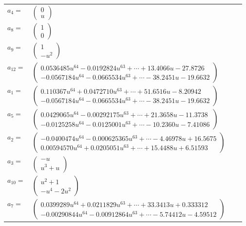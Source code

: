 \documentclass[1p]{elsarticle_modified}
\theoremstyle{definition}
\begin{document}
\begin{tabular}{m{7pt} m{180pt} m{7pt} m{180pt} }
\flushright $a_{4}=$&$\begin{pmatrix}0\\u\end{pmatrix}$ \\
\flushright $a_{8}=$&$\begin{pmatrix}1\\0\end{pmatrix}$ \\
\flushright $a_{9}=$&$\begin{pmatrix}1\\- u^2\end{pmatrix}$ \\
\flushright $a_{12}=$&$\begin{pmatrix}0.0536485 u^{64}-0.0192824 u^{63}+\cdots+13.4066 u-27.8726\\-0.0567184 u^{64}-0.0665534 u^{63}+\cdots-38.2451 u-19.6632\end{pmatrix}$ \\
\flushright $a_{1}=$&$\begin{pmatrix}0.110367 u^{64}+0.0472710 u^{63}+\cdots+51.6516 u-8.20942\\-0.0567184 u^{64}-0.0665534 u^{63}+\cdots-38.2451 u-19.6632\end{pmatrix}$ \\
\flushright $a_{5}=$&$\begin{pmatrix}0.0429065 u^{64}-0.00292175 u^{63}+\cdots+21.3658 u-11.3738\\-0.0125258 u^{64}-0.0125001 u^{63}+\cdots-10.2360 u-7.41086\end{pmatrix}$ \\
\flushright $a_{2}=$&$\begin{pmatrix}-0.0400474 u^{64}-0.000625365 u^{63}+\cdots-4.46978 u+16.5675\\0.00594570 u^{64}+0.0205051 u^{63}+\cdots+15.4488 u+6.51593\end{pmatrix}$ \\
\flushright $a_{3}=$&$\begin{pmatrix}- u\\u^3+u\end{pmatrix}$ \\
\flushright $a_{10}=$&$\begin{pmatrix}u^2+1\\- u^4-2 u^2\end{pmatrix}$ \\
\flushright $a_{7}=$&$\begin{pmatrix}0.0399289 u^{64}+0.0211829 u^{63}+\cdots+33.3413 u+0.333312\\-0.00290844 u^{64}-0.00912864 u^{63}+\cdots-5.74412 u-4.59512\end{pmatrix}$ \\

\end{tabular}
\end{document}
